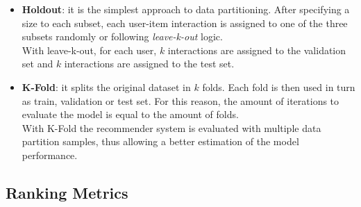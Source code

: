 \begin{itemize}
\item \textbf{Holdout}: it is the simplest approach to data partitioning. After specifying a size to each subset, each user-item interaction is assigned to one of the three subsets randomly or following \textit{leave-k-out} logic.\\
With leave-k-out, for each user, $k$ interactions are assigned to the validation set and $k$ interactions are assigned to the test set.
\item \textbf{K-Fold}: it splits the original dataset in $k$ folds. Each fold is then used in turn as train, validation or test set. For this reason, the amount of iterations to evaluate the model is equal to the amount of folds.\\
With K-Fold the recommender system is evaluated with multiple data partition samples, thus allowing a better estimation of the model performance.
\end{itemize}


\subsection{Ranking Metrics}

